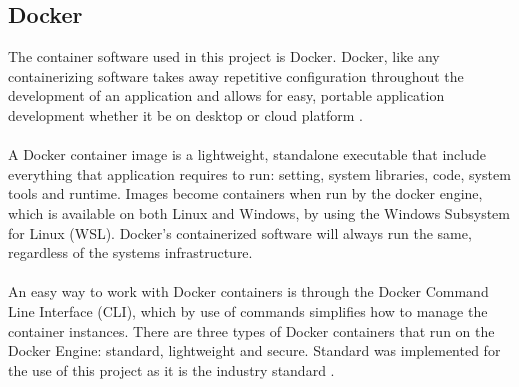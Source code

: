 \subsection{Docker}
The container software used in this project is Docker.  Docker, like any containerizing software takes away repetitive configuration throughout the development of an application and allows for easy, portable application development whether it be on desktop or cloud platform \cite{docker}.   \\\\
A Docker container image is a lightweight, standalone executable that include everything that application requires to run: setting, system libraries, code, system tools and runtime.  Images become containers when run by the docker engine, which is available on both Linux and Windows, by using the Windows Subsystem for Linux (WSL).  Docker's containerized software will always run the same, regardless of the systems infrastructure.  \\\\
An easy way to work with Docker containers is through the Docker Command Line Interface (CLI), which by use of commands simplifies how to manage the container instances.  There are three types of Docker containers that run on the Docker Engine: standard, lightweight and secure. Standard was implemented for the use of this project as it is the industry standard \cite{container}.

